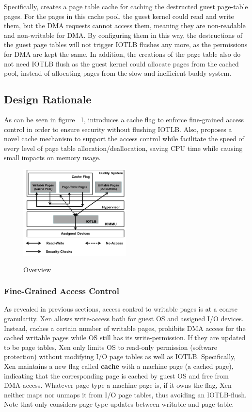 Specifically, \name creates a page table cache for caching the destructed guest page-table pages.
For the pages in this cache pool, the guest kernel could read and write them, but the DMA requests cannot access them, meaning they are non-readable and non-writable for DMA.
By configuring them in this way, the destructions of the guest page tables will not trigger IOTLB flushes any more, as the permissions for DMA are kept the same.
In addition, the creations of the page table also do not need IOTLB flush as the guest kernel could allocate pages from the cached pool, instead of allocating pages from the slow and inefficient buddy system.

\subsection{Design Rationale}
As can be seen in figure ~\ref{fig:overview}, \name introduces a cache flag to enforce fine-grained access control in order to ensure security without flushing IOTLB. Also, \name proposes a novel cache mechanism to support the access control while facilitate the speed of every level of page table allocation/deallocation, saving CPU time while causing small impacts on memory usage.

\begin{figure}[ht]
\centering
\includegraphics[width=0.5\textwidth]{image/overview/overview.png} \\
\caption{Overview}
\label{fig:overview}
\end{figure}

\subsubsection{Fine-Grained Access Control}
As revealed in previous sections, access control to writable pages is at a coarse granularity. Xen allows write-access both for guest OS and assigned I/O devices. Instead, \name caches a certain number of writable pages, prohibits DMA access for the cached writable pages while OS still has its write-permission. If they are updated to be page tables, Xen only limits OS to read-only permission (software protection) without modifying I/O page tables as well as IOTLB. Specifically, Xen maintains a new flag called \textbf{cache} with a machine page (a cached page), indicating that the corresponding page is cached by guest OS and free from DMA-access. Whatever page type a machine page is, if it owns the flag, Xen neither maps nor unmaps it from I/O page tables, thus avoiding an IOTLB-flush. Note that \name only considers page type updates between writable and page-table.

